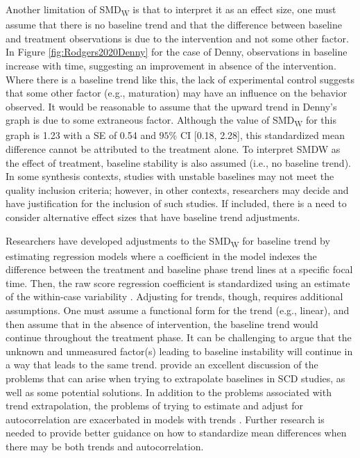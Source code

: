 \documentclass[
]{book}
\begin{document}
Another limitation of SMD\textsubscript{W} is that to interpret it as an effect size, one must assume that there is no baseline trend and that the difference between baseline and treatment observations is due to the intervention and not some other factor. In Figure \ref{fig:Rodgers2020Denny} for the case of Denny, observations in baseline increase with time, suggesting an improvement in absence of the intervention. Where there is a baseline trend like this, the lack of experimental control suggests that some other factor (e.g., maturation) may have an influence on the behavior observed. It would be reasonable to assume that the upward trend in Denny's graph is due to some extraneous factor.
Although the value of SMD\textsubscript{W} for this graph is 1.23 with a SE of 0.54 and \(95\%\) CI {[}0.18, 2.28{]}, this standardized mean difference cannot be attributed to the treatment alone. To interpret SMDW as the effect of treatment, baseline stability is also assumed (i.e., no baseline trend). In some synthesis contexts, studies with unstable baselines may not meet the quality inclusion criteria; however, in other contexts, researchers may decide and have justification for the inclusion of such studies. If included, there is a need to consider alternative effect sizes that have baseline trend adjustments.

Researchers have developed adjustments to the SMD\textsubscript{W} for baseline trend by estimating regression models where a coefficient in the model indexes the difference between the treatment and baseline phase trend lines at a specific focal time. Then, the raw score regression coefficient is standardized using an estimate of the within-case variability \citep{Maggin2017meta-analysis, van2003hierarchical}. Adjusting for trends, though, requires additional assumptions. One must assume a functional form for the trend (e.g., linear), and then assume that in the absence of intervention, the baseline trend would continue throughout the treatment phase.
It can be challenging to argue that the unknown and unmeasured factor(s) leading to baseline instability will continue in a way that leads to the same trend. \citet{Manolov_Solanas_Sierra_2019} provide an excellent discussion of the problems that can arise when trying to extrapolate baselines in SCD studies, as well as some potential solutions. In addition to the problems associated with trend extrapolation, the problems of trying to estimate and adjust for autocorrelation are exacerbated in models with trends \citep{Ferron_2002, NatesanBatley_Hedges_2021}. Further research is needed to provide better guidance on how to standardize mean differences when there may be both trends and autocorrelation.
\end{document}
